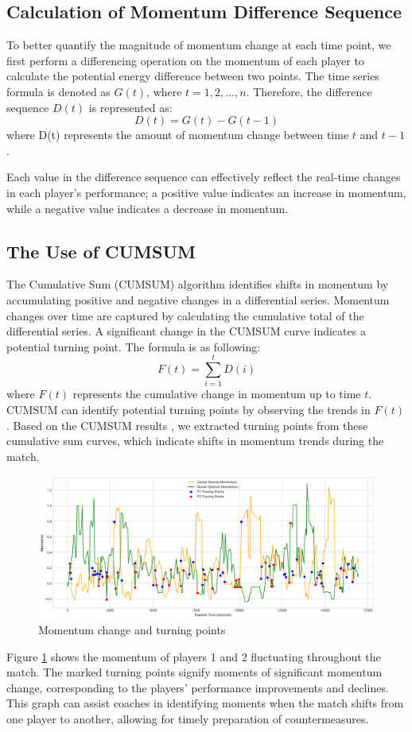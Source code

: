 \documentclass[12pt]{article}%
\begin{document}
\subsection{Calculation of Momentum Difference Sequence}
To better quantify the magnitude of momentum change at each time point, we first perform a differencing operation on the momentum of each player to calculate the potential energy difference between two points. The time series formula is denoted as $G(t)$, where $t=1,2,...,n$. Therefore, the difference sequence $D(t)$ is represented as:
\begin{equation}
 D(t) = G(t) - G(t-1) 
\end{equation}
where D(t) represents the amount of momentum change between time $t$ and $t-1$.

Each value in the difference sequence can effectively reflect the real-time changes in each player's performance; a positive value indicates an increase in momentum, while a negative value indicates a decrease in momentum.

\subsection{The Use of CUMSUM}
The Cumulative Sum (CUMSUM) algorithm identifies shifts in momentum by accumulating positive and negative changes in a differential series. Momentum changes over time are captured by calculating the cumulative total of the differential series. A significant change in the CUMSUM curve indicates a potential turning point. The formula is as following:
\begin{equation}
F(t)=\sum^t_{i=1}D(i)
\end{equation}
where $F(t)$ represents the cumulative change in momentum up to time $t$. CUMSUM can identify potential turning points by observing the trends in $F(t)$.
Based on the CUMSUM results , we extracted turning points from these cumulative sum curves, which indicate shifts in momentum trends \cite{KNOTTENBELT20123820} during the match.
\begin{figure}[H]
	\centering
	\includegraphics[scale=0.4]{figure//zzd.png}
	\caption{Momentum change and turning points}
	\label{zzd}
\end{figure}
Figure \ref{zzd} shows the momentum of players 1 and 2 fluctuating throughout the match. The marked turning points signify moments of significant momentum change, corresponding to the players' performance improvements and declines. This graph can assist coaches in identifying moments when the match shifts from one player to another, allowing for timely preparation of countermeasures.
\end{document}
